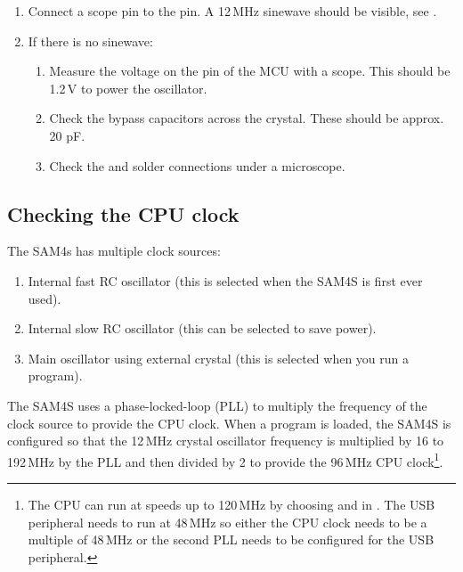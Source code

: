 \begin{enumerate}
\item Connect a scope pin to the  pin. A 12\,MHz sinewave
  should be visible, see .

\item If there is no sinewave:

  \begin{enumerate}
  \item Measure the voltage on the  pin of the MCU with a
    scope. This should be 1.2\,V to power the oscillator.

  \item Check the bypass capacitors across the crystal.  These should
    be approx. 20 pF.

  \item Check the  and  solder connections under a
    microscope.
  \end{enumerate}
\end{enumerate}


\subsection{Checking the CPU clock}
\label{checking-the-clock}

The SAM4s has multiple clock sources:

\begin{enumerate}
\item
  Internal fast RC oscillator (this is selected when the SAM4S is first
  ever used).
\item
  Internal slow RC oscillator (this can be selected to save power).
\item
  Main oscillator using external crystal (this is selected when you
  run a program).
\end{enumerate}

The SAM4S uses a phase-locked-loop (PLL) to multiply the frequency of
the clock source to provide the CPU clock.  When a program is loaded,
the SAM4S is configured so that the 12\,MHz crystal oscillator
frequency is multiplied by 16 to 192\,MHz by the PLL and then divided
by 2 to provide the 96\,MHz CPU clock\footnote{The CPU can run at
  speeds up to 120\,MHz by choosing  and
   in .  The USB peripheral needs to
  run at 48\,MHz so either the CPU clock needs to be a multiple of
  48\,MHz or the second PLL needs to be configured for the USB
  peripheral.}.

